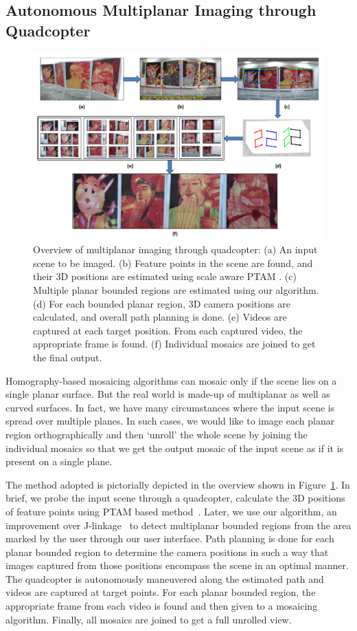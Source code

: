 \subsection{Autonomous Multiplanar Imaging through Quadcopter}
\begin{figure}[h!]
\centering
\includegraphics[width=0.98\linewidth]{figures/multiplanar/workflow}
\caption[Overflow of autonomous multiplanar imaging through quadcopter]{Overview
of multiplanar imaging through quadcopter:
(a) An input scene to be imaged.
(b) Feature points in the scene are found, and their 3D positions are estimated
using scale aware PTAM \cite{engel}. (c) Multiple planar bounded regions are
estimated using our algorithm. (d) For each bounded planar region, 3D camera
positions are calculated, and overall path planning is done. (e) Videos are
captured at each target position. From each captured video, the appropriate
frame is found. (f) Individual mosaics are joined to get the final output.}
\label{fig:multiplanar_workflow}
\end{figure}

Homography-based mosaicing algorithms can mosaic only if the scene lies on a single planar
surface. But the real world is made-up of multiplanar as well as curved surfaces.
In fact, we have many circumstances where the input scene is spread over
multiple planes. In such cases, we would like to image each planar region
orthographically and then `unroll' the whole scene by joining the individual
mosaics so that we get the output mosaic of the input scene as if it is present
on a single plane.

The method adopted is pictorially depicted in the overview shown in
Figure~\ref{fig:multiplanar_workflow}. In brief, we probe the input scene
through a quadcopter, calculate the 3D positions of feature points using PTAM
based method~\cite{engel}. Later, we use our algorithm, an improvement over
J-linkage~\cite{jlinkage} to detect multiplanar bounded regions from the area
marked by the user through our user interface. Path planning is done for each
planar bounded region to determine the camera positions in such a way that
images captured from those positions encompass the scene in an optimal manner.
The quadcopter is autonomously maneuvered along the estimated path and videos
are captured at target points. For each planar bounded region, the appropriate
frame from each video is found and then given to a mosaicing algorithm. 
Finally, all mosaics are joined to get a full unrolled view.

